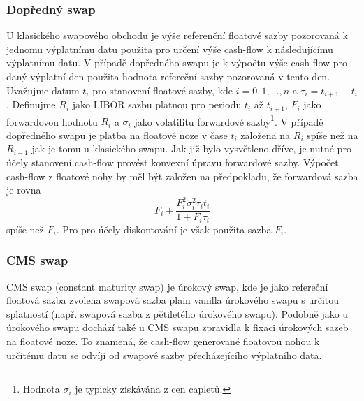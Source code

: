 \documentclass[a4paper]{book}
\begin{document}
\subsubsection{Dopředný swap}

U klasického swapového obchodu je výše referenční floatové sazby pozorovaná k jednomu výplatnímu datu použita pro určení výše cash-flow k následujícímu výplatnímu datu. V případě dopředného swapu je k výpočtu výše cash-flow pro daný výplatní den použita hodnota refereční sazby pozorovaná v tento den.\\

Uvažujme datum $t_i$ pro stanovení floatové sazby, kde $i = 0, 1,...,n$ a $\tau_i = t_{i+1}-t_i$. Definujme $R_i$ jako LIBOR sazbu platnou pro periodu $t_i$ až $t_{i+1}$, $F_i$ jako forwardovou hodnotu $R_i$ a $\sigma_i$ jako volatilitu forwardové sazby\footnote{Hodnota $\sigma_i$ je typicky získávána z cen capletů.}. V případě dopředného swapu je platba na floatové noze v čase $t_i$ založena na $R_i$ spíše než na $R_{i-1}$ jak je tomu u klasického swapu. Jak již bylo vysvětleno dříve, je nutné pro účely stanovení cash-flow provést konvexní úpravu forwardové sazby. Výpočet cash-flow z floatové nohy by měl být založen na předpokladu, že forwardová sazba je rovna
\begin{equation*}
F_i + \frac{F^2_i \sigma^2_i \tau_i t_i}{1 + F_i \tau_i}
\end{equation*}
spíše než $F_i$. Pro pro účely diskontování je však použita sazba $F_i$.

\subsubsection{CMS swap}

CMS swap (constant maturity swap) je úrokový swap, kde je jako refereční floatová sazba zvolena swapová sazba plain vanilla úrokového swapu s určitou splatností (např. swapová sazba z pětiletého úrokového swapu). Podobně jako u úrokového swapu dochází také u CMS swapu zpravidla k fixaci úrokových sazeb na floatové noze. To znamená, že cash-flow generované floatovou nohou k určitému datu se odvíjí od swapové sazby přecházejícího výplatního data.\\
\end{document}
